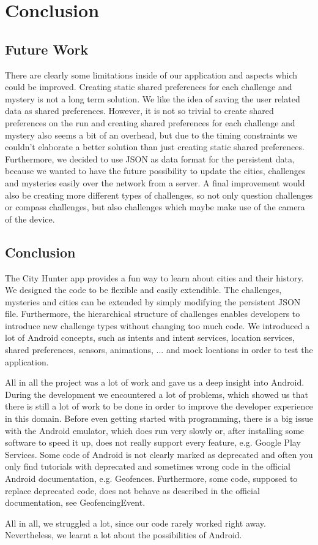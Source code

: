 \chapter{Conclusion}

\section{Future Work}

There are clearly some limitations inside of our application and aspects which could be improved. Creating static shared preferences for each challenge and mystery is not a long term solution. We like the idea of saving the user related data as shared preferences. However, it is not so trivial to create shared preferences on the run and creating shared preferences for each challenge and mystery also seems a bit of an overhead, but due to the timing constraints we couldn't elaborate a better solution than just creating static shared preferences. Furthermore, we decided to use JSON as data format for the persistent data, because we wanted to have the future possibility to update the cities, challenges and mysteries easily over the network from a server. A final improvement would also be creating more different types of challenges, so not only question challenges or compass challenges, but also challenges which maybe make use of the camera of the device.

\section{Conclusion}

The City Hunter app provides a fun way to learn about cities and their history. We designed the code to be flexible and easily extendible. The challenges, mysteries and cities can be extended by simply modifying the persistent JSON file. Furthermore, the hierarchical structure of challenges enables developers to introduce new challenge types without changing too much code.
We introduced a lot of Android concepts, such as intents and intent services, location services, shared preferences, sensors, animations, ... and mock locations in order to test the application.

All in all the project was a lot of work and gave us a deep insight into Android. During the development we encountered a lot of problems, which showed us that there is still a lot of work to be done in order to improve the developer experience in this domain. 
Before even getting started with programming, there is a big issue with the Android emulator, which does run very slowly or, after installing some software to speed it up, does not really support every feature, e.g. Google Play Services. Some code of Android is not clearly marked as deprecated and often you only find tutorials with deprecated and sometimes wrong code in the official Android documentation, e.g. Geofences. Furthermore, some code, supposed to replace deprecated code, does not behave as described in the official documentation, see GeofencingEvent.

All in all, we struggled a lot, since our code rarely worked right away.
Nevertheless, we learnt a lot about the possibilities of Android.
